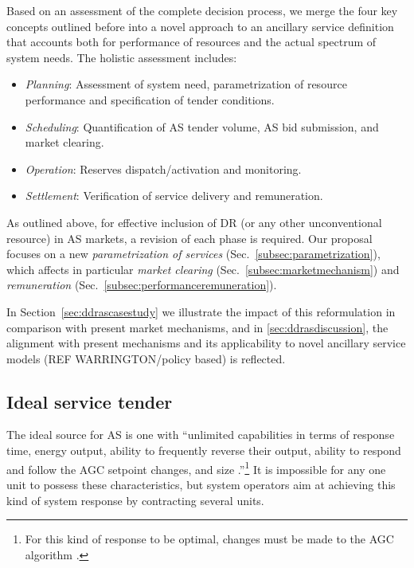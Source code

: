 Based on an assessment of the complete decision process, we merge the four key concepts outlined before into a novel approach to an ancillary service definition that accounts both for performance of resources and the actual spectrum of system needs.  %
The holistic assessment includes:
\begin{itemize}
	\item \textit{Planning}: Assessment of system need, parametrization of resource performance and specification of tender conditions.

	\item \textit{Scheduling}: Quantification of AS tender volume, AS bid submission, and market clearing.

	\item \textit{Operation}: Reserves dispatch/activation and monitoring.

	\item \textit{Settlement}: Verification of service delivery and remuneration.
\end{itemize}

As outlined above, for effective inclusion of DR (or any other unconventional resource) in AS markets, a revision of each phase is required. Our proposal focuses on a new \textit{parametrization of services} (Sec.~\ref{subsec:parametrization}), which affects in particular \textit{market clearing} (Sec.~\ref{subsec:marketmechanism}) and \textit{remuneration} (Sec.~\ref{subsec:performanceremuneration}). 

In Section~\ref{sec:ddrascasestudy} we illustrate the impact of this reformulation in comparison with present market mechanisms, and in \ref{sec:ddrasdiscussion}, the alignment with present mechanisms and its applicability to novel ancillary service models (REF WARRINGTON/policy based) is reflected.  

\subsection{Ideal service tender}\label{subsec:idealtender}
The ideal source for AS is one with ``unlimited capabilities in terms of response time, energy output, ability to frequently reverse their output, ability to respond and follow the AGC setpoint changes, and size .''\cite{makarov2008assessing}\footnote{For this kind of response to be optimal, changes must be made to the AGC algorithm \cite{peydayesh2012effects}.} It is impossible for any one unit to possess these characteristics, but system operators aim at achieving this kind of system response by contracting several units.


